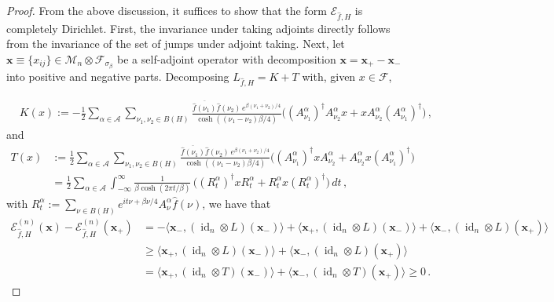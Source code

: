 \documentclass[11pt]{amsart}
\newcommand{\1}{\mathbbm{1}}
\theoremstyle{plain}
\theoremstyle{definition}
\theoremstyle{remark}
\numberwithin{equation}{section}
\begin{document}
\begin{proof}
From the above discussion, it suffices to show that the 
form $\mathcal{E}_{\widehat{f},H}$ is completely Dirichlet. First, the invariance under taking adjoints directly follows from the invariance of the set of jumps under adjoint taking. Next, let $\mathbf{x}\equiv \{x_{ij}\}\in {\mathscr{M}}_n\otimes \mathscr{F}_{\sigma_\beta}$ be a self-adjoint operator with decomposition $\mathbf{x}=\mathbf{x}_+-\mathbf{x}_-$ into positive and negative parts. Decomposing $L_{\widehat{f},H}=K+T$ with, given $x\in\mathscr{F}$,



\begin{align*}
&K(x):=-\frac{1}{2}\sum_{\alpha\in\mathcal{A}}\sum_{\nu_1,\nu_2\in B(H)}\frac{\overline{\widehat{f}(\nu_1)}\widehat{f}(\nu_2)\,e^{\beta(\nu_1+\nu_2)/4}}{\cosh((\nu_1-\nu_2)\beta/4)}  \Big((A^\alpha_{\nu_1})^\dagger A^\alpha_{\nu_2}x+x A^\alpha_{\nu_2}(A^\alpha_{\nu_1})^\dagger\Big)\,,
\end{align*}
and 
\begin{align}
T(x)&:=\frac{1}{2}\sum_{\alpha\in\mathcal{A}}\sum_{\nu_1,\nu_2\in B(H)}\frac{\overline{\widehat{f}(\nu_1)}\widehat{f}(\nu_2)\,e^{\beta(\nu_1+\nu_2)/4}}{\cosh((\nu_1-\nu_2)\beta/4)} \Big((A^\alpha_{\nu_1})^\dagger x A^\alpha_{\nu_2}+A^\alpha_{\nu_2}x(A^\alpha_{\nu_1})^\dagger \Big)\nonumber \\
&= \frac{1}{2}\sum_{\alpha\in\mathcal{A}}  \int_{-\infty}^\infty \frac{1}{\beta\operatorname{cosh}(2\pi t/\beta)}\,\Big((R^\alpha_t)^\dagger x R^\alpha_t+R^\alpha_tx(R^\alpha_t)^\dagger \Big) \,dt\label{eq.FourierintsechTmap} \,,
\end{align}
with $R^\alpha_t:=\sum_{\nu\in B(H)}e^{it\nu+\beta\nu/4}A^\alpha_\nu\widehat{f}(\nu)$, we have that
\begin{align*}
\mathcal{E}_{\widehat{f},H}^{(n)}(\mathbf{x})-\mathcal{E}_{\widehat{f},H}^{(n)}(\mathbf{x}_+)&=-\langle \mathbf{x}_-,(\operatorname{id}_n\otimes L)(\mathbf{x}_-)\rangle  +\langle \mathbf{x}_+,(\operatorname{id}_n\otimes L)(\mathbf{x}_-)\rangle+\langle \mathbf{x}_-,(\operatorname{id}_n\otimes L)(\mathbf{x}_+)\rangle\\
&\ge \langle \mathbf{x}_+,(\operatorname{id}_n\otimes L)(\mathbf{x}_-)\rangle+\langle \mathbf{x}_-,(\operatorname{id}_n\otimes L)(\mathbf{x}_+)\rangle\\
&=\langle \mathbf{x}_+,({\operatorname{id}}_n\otimes T)(\mathbf{x}_-)\rangle+\langle \mathbf{x}_-,({\operatorname{id}}_n\otimes T)(\mathbf{x}_+)\rangle\ge 0\,.
\end{align*}

\end{proof}
\end{document}
